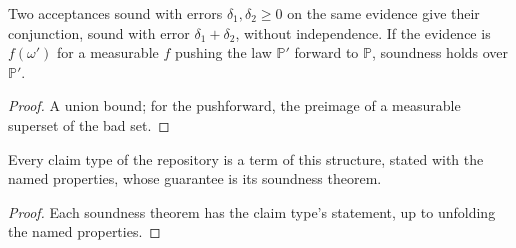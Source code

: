 \begin{theorem}\label{thm:sound_and}
\leanok
{}
Two acceptances sound with errors $\delta_1, \delta_2 \ge 0$ on the same evidence give their
conjunction, sound with error $\delta_1 + \delta_2$, without independence. If the evidence is
$f(\omega')$ for a measurable $f$ pushing the law $\mathbb P'$ forward to $\mathbb P$, soundness holds
over $\mathbb P'$.
\end{theorem}
\begin{proof}
\leanok
A union bound; for the pushforward, the preimage of a measurable superset of the bad set.
\end{proof}

\begin{theorem}\label{thm:claim_types}
\leanok
{}
Every claim type of the repository is a term of this structure, stated with the named properties,
whose guarantee is its soundness theorem.
\end{theorem}
\begin{proof}
\leanok
Each soundness theorem has the claim type's statement, up to unfolding the named properties.
\end{proof}

